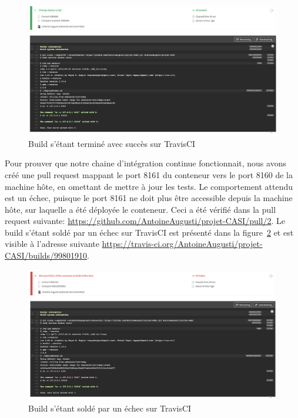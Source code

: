     \begin{figure}[H]
        \centering
        \includegraphics[width=\textwidth]{images/travis-build-success.png}
        \caption{Build s'étant terminé avec succès sur TravisCI}
        \label{fig:travis-build-success}
    \end{figure}

    Pour prouver que notre chaine d'intégration continue fonctionnait, nous avons créé une pull request mappant le port 8161 du conteneur vers le port 8160 de la machine hôte, en omettant de mettre à jour les tests. Le comportement attendu est un échec, puisque le port 8161 ne doit plus être accessible depuis la machine hôte, sur laquelle a été déployée le conteneur. Ceci a été vérifié dans la pull request suivante: \url{https://github.com/AntoineAugusti/projet-CASI/pull/2}. Le build s'étant soldé par un échec sur TravisCI est présenté dans la figure~\ref{fig:travis-build-failure} et est visible à l'adresse suivante \url{https://travis-ci.org/AntoineAugusti/projet-CASI/builds/99801910}.

    \begin{figure}[H]
        \centering
        \includegraphics[width=\textwidth]{images/travis-build-failure.png}
        \caption{Build s'étant soldé par un échec sur TravisCI}
        \label{fig:travis-build-failure}
    \end{figure}

